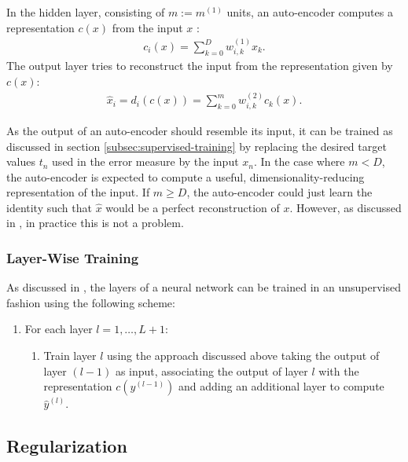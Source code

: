 In the hidden layer, consisting of $m := m^{(1)}$ units, an auto-encoder computes a representation $c(x)$ from the input $x$ \cite{Bengio:2009}:
\begin{align}
	c_i(x) = \sum_{k = 0} ^D w_{i,k}^{(1)} x_k.
\end{align}
The output layer tries to reconstruct the input from the representation given by $c(x)$:
\begin{align}
	\hat{x}_i = d_i(c(x)) = \sum_{k = 0} ^m w_{i,k}^{(2)} c_k(x).
\end{align}

As the output of an auto-encoder should resemble its input, it can be trained as discussed in section \ref{subsec:supervised-training} by replacing the desired target values $t_n$ used in the error measure by the input $x_n$. In the case where $m < D$, the auto-encoder is expected to compute a useful, dimensionality-reducing representation of the input. If $m \geq D$, the auto-encoder could just learn the identity such that $\hat{x}$ would be a perfect reconstruction of $x$. However, as discussed in \cite{Bengio:2009}, in practice this is not a problem.

\subsubsection{Layer-Wise Training}
\label{subsubsec:layer-wise-training}

As discussed in \cite{LarochelleBengioLouradourLamblinBottou:2009}, the layers of a neural network can be trained in an unsupervised fashion using the following scheme:
\begin{enumerate}[1.]
	\item For each layer $l = 1, \ldots, L+1$:
	\begin{enumerate}[--]
		\item Train layer $l$ using the approach discussed above taking the output of layer $(l-1)$ as input, associating the output of layer $l$ with the representation $c(y^{(l-1)})$ and adding an additional layer to compute $\hat{y}^{(l)}$.
	\end{enumerate}
\end{enumerate}

\subsection{Regularization}

